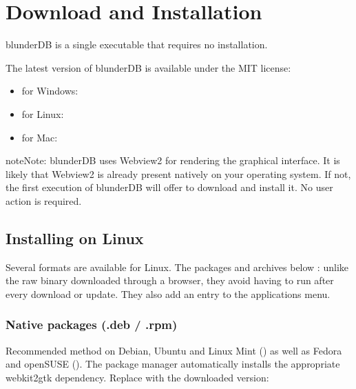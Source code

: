 \documentclass[letterpaper,10pt,english]{sphinxmanual}
\begin{document}
\section{Download and Installation}
\label{\detokenize{telecharge_install:telechargement-et-installation}}\label{\detokenize{telecharge_install:telecharge-install}}\label{\detokenize{telecharge_install::doc}}
\sphinxAtStartPar
blunderDB is a single executable that requires no installation.

\sphinxAtStartPar
The latest version of blunderDB is available under the MIT license:
\begin{itemize}
\item {} 
\sphinxAtStartPar
for Windows: 

\item {} 
\sphinxAtStartPar
for Linux: 

\item {} 
\sphinxAtStartPar
for Mac: 

\end{itemize}

\begin{sphinxadmonition}{note}{Note:}
\sphinxAtStartPar
blunderDB uses Webview2 for rendering the graphical interface. It is likely that Webview2 is already present natively on your operating system. If not, the first execution of blunderDB will offer to download and install it. No user action is required.
\end{sphinxadmonition}


\subsection{Installing on Linux}
\label{\detokenize{telecharge_install:installation-sous-linux}}
\sphinxAtStartPar
Several formats are available for Linux. The packages and archives below : unlike the raw binary downloaded through a browser, they avoid having to run  after every download or update. They also add an entry to the applications menu.


\subsubsection{Native packages (.deb / .rpm)}
\label{\detokenize{telecharge_install:paquets-natifs-deb-rpm}}
\sphinxAtStartPar
Recommended method on Debian, Ubuntu and Linux Mint () as well as Fedora and openSUSE (). The package manager automatically installs the appropriate webkit2gtk dependency. Replace  with the downloaded version:
\end{document}
